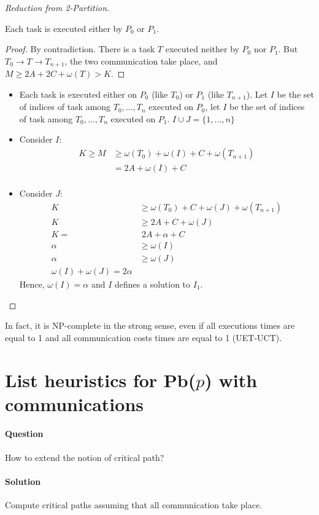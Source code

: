 \begin{proof}[Reduction from 2-Partition]
\begin{lemma}
Each task is executed either by $P_0$ or $P_1$.
\end{lemma}
\begin{proof}
By contradiction. There is a task $T$ executed neither by $P_0$ nor $P_1$. But $T_0 \to T \to T_{n+1}$, the two communication take place, and $M\geq 2A+2C+\omega(T)>K$.
\end{proof}

\begin{itemize}
\item Each task is executed either on $P_0$ (like $T_0$) or $P_1$ (like $T_{n+1}$). Let $I$ be the set of indices of task among $T_0,...,T_n$ executed on $P_0$, let $I$ be the set of indices of task among $T_0,...,T_n$ executed on $P_1$.
$I\cup J=\{1,...,n\}$
\item Consider $I$:
\begin{align*}
K\geq M & \geq \omega(T_0) + \omega(I)+C+\omega(T_{n+1})\\
& = 2A + \omega(I)+C\\
\end{align*}

\item Consider $J$:
\begin{align*}
K & \geq \omega(T_0) + C + \omega(J) + \omega(T_{n+1})\\
K & \geq 2A + C + \omega (J)\\
K= &\; 2A+\alpha+C\\
\alpha & \geq \omega(I)\\
\alpha & \geq \omega(J)\\
\omega(I)+\omega(J)=2\alpha
\end{align*}
Hence, $\omega(I)=\alpha$ and $I$ defines a solution to $I_1$.
\end{itemize}
\end{proof}

In fact, it is NP-complete in the strong sense, even if all executions times are equal to 1 and all communication costs times are equal to 1 (UET-UCT).

\section{List heuristics for Pb($p$) with communications}
\paragraph{Question}
How to extend the notion of critical path?
\paragraph{Solution}
Compute critical paths assuming that all communication take place.

